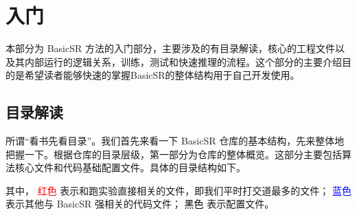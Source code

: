 \documentclass[../main.tex]{subfiles}
\begin{document}
\chapter{入门}
\vspace{-2cm}

本部分为 BasicSR 方法的入门部分，主要涉及的有目录解读，核心的工程文件以及其内部运行的逻辑关系，训练，测试和快速推理的流程。这个部分的主要介绍目的是希望读者能够快速的掌握BasicSR的整体结构用于自己开发使用。


\section{目录解读}\label{getting_start:content-overview}

所谓“看书先看目录”。我们首先来看一下 BasicSR 仓库的基本结构，先来整体地把握一下。根据仓库的目录层级，第一部分为仓库的整体概览。这部分主要包括算法核心文件和代码基础配置文件。具体的目录结构如下。

其中，\newline
\noindent\textcolor{red}{红色} 表示和跑实验直接相关的文件，即我们平时打交道最多的文件；\newline
\noindent\textcolor{blue}{蓝色} 表示其他与 BasicSR 强相关的代码文件；\newline
\noindent\textcolor{black}{黑色} 表示配置文件。
\end{document}
